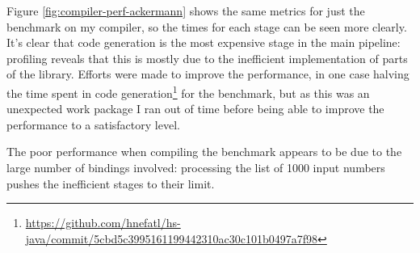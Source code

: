 \documentclass[dissertation.tex]{subfiles}
\begin{document}
{{        Figure \ref{fig:compiler-perf-ackermann} shows the same metrics for just the  benchmark on my compiler, so the times for each stage can be seen more clearly. It's clear that code generation is the most expensive stage in the main pipeline: profiling reveals that this is mostly due to the inefficient implementation of parts of the  library. Efforts were made to improve the performance, in one case halving the time spent in code generation\footnote{\url{https://github.com/hnefatl/hs-java/commit/5cbd5c3995161199442310ac30c101b0497a7f98}} for the  benchmark, but as this was an unexpected work package I ran out of time before being able to improve the performance to a satisfactory level.
        
        The poor performance when compiling the  benchmark appears to be due to the large number of bindings involved: processing the list of 1000 input numbers pushes the inefficient stages to their limit. 

}}
\end{document}
